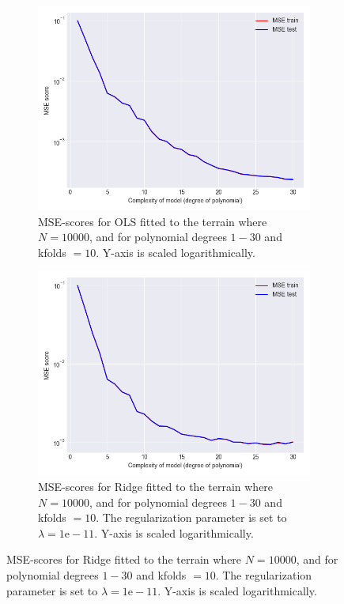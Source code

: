 \documentclass[a4paper,twocolumn]{article}
\begin{document}
\begin{figure}[H]
    \centering
    \begin{subfigure}[b]{0.9\columnwidth}
        \includegraphics[width=\columnwidth]{mse_vs_complexity_OLS_N=10000_Noise=0.0_Degree=1-30.png}
        \caption{MSE-scores for OLS fitted to the terrain where $N = 10000$, and for polynomial degrees $1- 30$ and kfolds $= 10$. Y-axis is scaled logarithmically.}
    \end{subfigure}
    
    \begin{subfigure}[b]{0.9\columnwidth}
        \includegraphics[width=\columnwidth]{mse_vs_complexity_Ridge_N=10000_Noise=0.0_Degree=1-30.png}
        \caption{MSE-scores for Ridge fitted to the terrain where $N = 10000$, and for polynomial degrees $1- 30$ and kfolds $= 10$. The regularization parameter is set to $\lambda = 1\textrm{e}-11$. Y-axis is scaled logarithmically.}
    \end{subfigure}
    

\end{figure}
\end{document}
